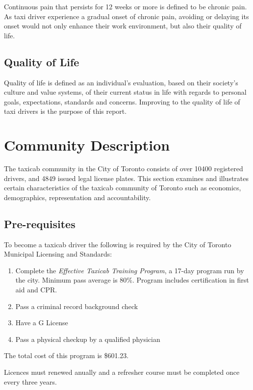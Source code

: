 \documentclass[11pt]{article}
\begin{document}
Continuous pain that persists for 12 weeks or more is defined to be
chronic pain\cite{chronic}. As taxi driver experience a gradual onset of chronic
pain, avoiding or delaying its onset would not only enhance their work
environment, but also their quality of life.

\subsection{Quality of Life}
\label{sec:lifequal}

Quality of life is defined as an individual’s evaluation, based on
their society’s culture and value systems, of their current status in
life with regards to personal goals, expectations, standards and
concerns\cite{WHO}. Improving to the quality of life of taxi drivers is the
purpose of this report.

\section{Community Description}
\label{sec:community}
The taxicab community in the City of Toronto consists of over 10400 registered drivers, 
and 4849 issued legal license plates. This section examines and 
illustrates certain characteristics of the taxicab community of Toronto such as economics, 
demographics, representation and accountability.

\subsection{Pre-requisites}
To become a taxicab driver the following is required by the City of Toronto Municipal Licensing and Standards:
\begin{enumerate}
\item Complete the \emph{Effective Taxicab Training Program}, a 17-day program run by the city. 
Minimum pass average is 80\%. Program includes certification in first aid and CPR.
\item Pass a criminal record background check
\item Have a G License
\item Pass a physical checkup by a qualified physician
\end{enumerate}
The total cost of this program is \$601.23\cite{MLS2013}.

Licences must renewed anually %
and a refresher course must be completed once every three years\cite{MLSChp545}.
\end{document}
